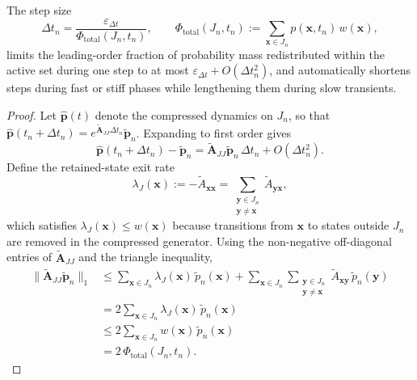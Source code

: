 \documentclass[onefignum,onetabnum]{siamart171218}
\begin{document}
\begin{proposition}
\label{prop:flux-timestep}
The step size
\begin{equation}
\label{eq:flux-timestep}
\Delta t_n = \frac{\varepsilon_{\Delta t}}{\Phi_{\mathrm{total}}(J_n,t_n)}, \qquad \Phi_{\mathrm{total}}(J_n,t_n) := \sum_{\boldsymbol{x}\in J_n} p(\boldsymbol{x},t_n)\,w(\boldsymbol{x}),
\end{equation}
limits the leading-order fraction of probability mass redistributed within the active set during one step to at most $\varepsilon_{\Delta t} + O(\Delta t_n^2)$, and automatically shortens steps during fast or stiff phases while lengthening them during slow transients.
\end{proposition}
\begin{proof}
Let $\widehat{\boldsymbol{p}}(t)$ denote the compressed dynamics on $J_n$, so that $\widehat{\boldsymbol{p}}(t_n+\Delta t_n) = e^{\widetilde{\mathbf{A}}_{JJ}\Delta t_n}\widetilde{\boldsymbol{p}}_n$. Expanding to first order gives
\[
\widehat{\boldsymbol{p}}(t_n+\Delta t_n) - \widetilde{\boldsymbol{p}}_n = \widetilde{\mathbf{A}}_{JJ}\widetilde{\boldsymbol{p}}_n\,\Delta t_n + O(\Delta t_n^2).
\]
Define the retained-state exit rate
\[
\lambda_J(\boldsymbol{x}) := -\widetilde{A}_{\boldsymbol{x}\boldsymbol{x}} = \sum_{\substack{\boldsymbol{y}\in J_n\\ \boldsymbol{y}\neq \boldsymbol{x}}} \widetilde{A}_{\boldsymbol{y}\boldsymbol{x}},
\]
which satisfies $\lambda_J(\boldsymbol{x}) \leq w(\boldsymbol{x})$ because transitions from $\boldsymbol{x}$ to states outside $J_n$ are removed in the compressed generator. Using the non-negative off-diagonal entries of $\widetilde{\mathbf{A}}_{JJ}$ and the triangle inequality,
\begin{align*}
\|\widetilde{\mathbf{A}}_{JJ}\widetilde{\boldsymbol{p}}_n\|_1
&\leq \sum_{\boldsymbol{x}\in J_n}\lambda_J(\boldsymbol{x})\,\widetilde{p}_n(\boldsymbol{x})
+ \sum_{\boldsymbol{x}\in J_n}\sum_{\substack{\boldsymbol{y}\in J_n\\ \boldsymbol{y}\neq \boldsymbol{x}}}\widetilde{A}_{\boldsymbol{x}\boldsymbol{y}}\,\widetilde{p}_n(\boldsymbol{y}) \\
&= 2\sum_{\boldsymbol{x}\in J_n}\lambda_J(\boldsymbol{x})\,\widetilde{p}_n(\boldsymbol{x}) \\
&\leq 2\sum_{\boldsymbol{x}\in J_n}w(\boldsymbol{x})\,\widetilde{p}_n(\boldsymbol{x}) \\
&= 2\,\Phi_{\mathrm{total}}(J_n,t_n).
\end{align*}

\end{proof}
\end{document}
